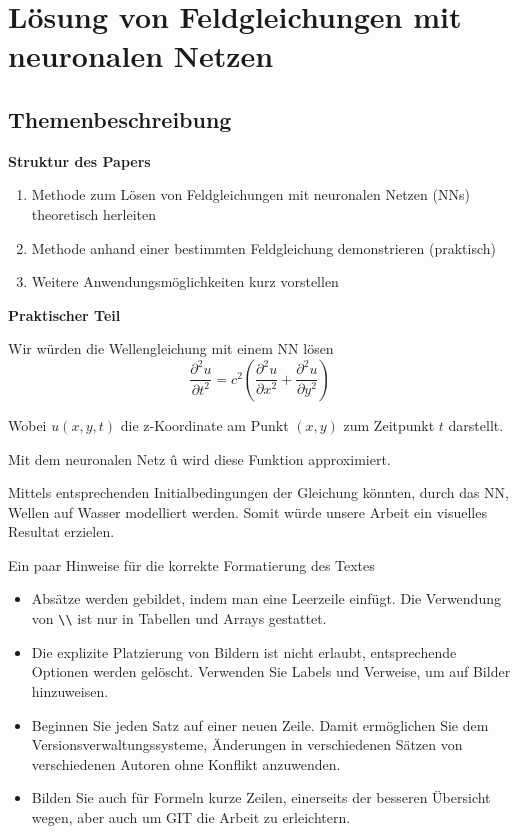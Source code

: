 %
%
%
%
\chapter{Lösung von Feldgleichungen mit neuronalen Netzen\label{chapter:neuronal}}
\begin{refsection}

\section{Themenbeschreibung}
\textbf{Struktur des Papers}
\begin{enumerate}
    \item Methode zum Lösen von Feldgleichungen mit neuronalen Netzen (NNs) theoretisch herleiten
    \item Methode anhand einer bestimmten Feldgleichung demonstrieren (praktisch)
    \item Weitere Anwendungsmöglichkeiten kurz vorstellen\newline
\end{enumerate}

\textbf{Praktischer Teil}

Wir würden die Wellengleichung mit einem NN lösen
\begin{equation}
    \frac{\partial^2 u}{\partial t^2} = c^2 \left( \frac{\partial^2 u}{\partial x^2} + \frac{\partial^2 u}{\partial y^2} \right)
\end{equation}


Wobei \( u(x, y, t) \) die z-Koordinate am Punkt \( (x, y) \) zum Zeitpunkt \( t \) darstellt.

Mit dem neuronalen Netz \^{u} wird diese Funktion approximiert.\newline

Mittels entsprechenden Initialbedingungen der Gleichung könnten, durch das NN, Wellen auf Wasser modelliert werden.
Somit würde unsere Arbeit ein visuelles Resultat erzielen.\newline

Ein paar Hinweise für die korrekte Formatierung des Textes
\begin{itemize}
\item
Absätze werden gebildet, indem man eine Leerzeile einfügt.
Die Verwendung von \verb+\\+ ist nur in Tabellen und Arrays gestattet.
\item
Die explizite Platzierung von Bildern ist nicht erlaubt, entsprechende
Optionen werden gelöscht. 
Verwenden Sie Labels und Verweise, um auf Bilder hinzuweisen.
\item
Beginnen Sie jeden Satz auf einer neuen Zeile. 
Damit ermöglichen Sie dem Versionsverwaltungssysteme, Änderungen
in verschiedenen Sätzen von verschiedenen Autoren ohne Konflikt 
anzuwenden.
\item 
Bilden Sie auch für Formeln kurze Zeilen, einerseits der besseren
Übersicht wegen, aber auch um GIT die Arbeit zu erleichtern.
\end{itemize}


\end{refsection}

